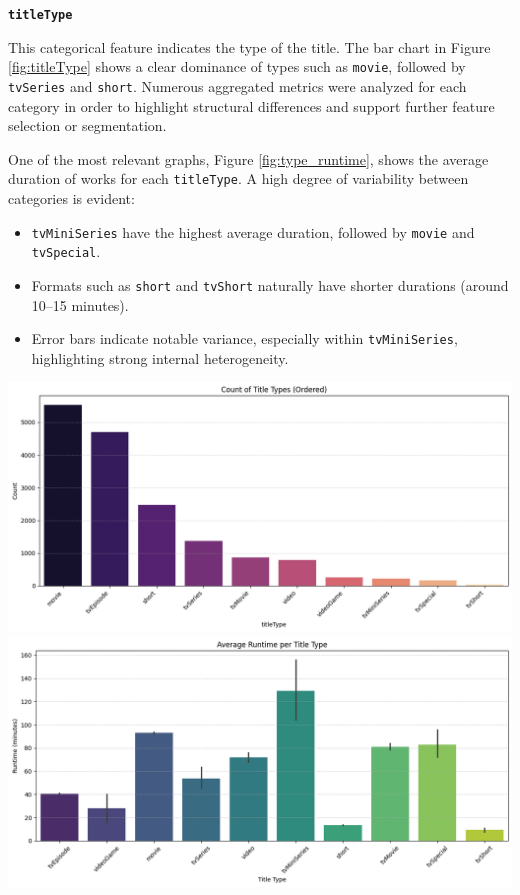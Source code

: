 \documentclass[10pt]{article}
\begin{document}
\begin{minipage}{0.45\textwidth}
\textbf{\texttt{titleType}}\par
This categorical feature indicates the type of the title. The bar chart in Figure \ref{fig:titleType} shows a clear dominance of types such as \texttt{movie}, followed by \texttt{tvSeries} and \texttt{short}. Numerous aggregated metrics were analyzed for each category in order to highlight structural differences and support further feature selection or segmentation.

One of the most relevant graphs, Figure \ref{fig:type_runtime}, shows the average duration of works for each \texttt{titleType}. A high degree of variability between categories is evident:
\begin{itemize}
    \item \texttt{tvMiniSeries} have the highest average duration, followed by \texttt{movie} and \texttt{tvSpecial}.
    \item Formats such as \texttt{short} and \texttt{tvShort} naturally have shorter durations (around 10--15 minutes).
    \item Error bars indicate notable variance, especially within \texttt{tvMiniSeries}, highlighting strong internal heterogeneity.
\end{itemize}
\end{minipage}
\hfill
\begin{minipage}{0.5\textwidth}
\centering
\includegraphics[width=0.9\linewidth]{titleTyple.png}
\label{fig:titleType}
\vspace{0.5cm}
\includegraphics[width=0.9\linewidth]{titleType_runtime.png}
\label{fig:type_runtime}
\end{minipage}
\end{document}

